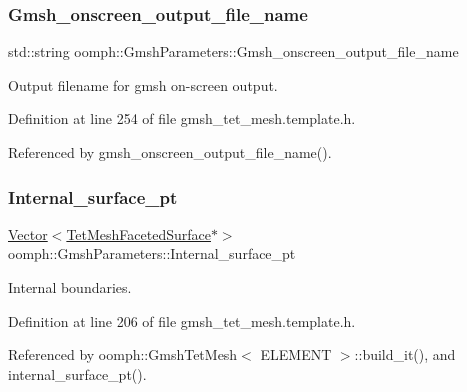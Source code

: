 \subsubsection{\texorpdfstring{Gmsh\+\_\+onscreen\+\_\+output\+\_\+file\+\_\+name}{Gmsh\_onscreen\_output\_file\_name}}
{\footnotesize\ttfamily std\+::string oomph\+::\+Gmsh\+Parameters\+::\+Gmsh\+\_\+onscreen\+\_\+output\+\_\+file\+\_\+name\hspace{0.3cm}{\ttfamily [private]}}



Output filename for gmsh on-\/screen output. 



Definition at line 254 of file gmsh\+\_\+tet\+\_\+mesh.\+template.\+h.



Referenced by gmsh\+\_\+onscreen\+\_\+output\+\_\+file\+\_\+name().

\mbox{\label{classoomph_1_1GmshParameters_aaa4afdde73a7fc67d5c2ba2976235381}} 
\subsubsection{\texorpdfstring{Internal\+\_\+surface\+\_\+pt}{Internal\_surface\_pt}}
{\footnotesize\ttfamily \hyperlink{classoomph_1_1Vector}{Vector}$<$\hyperlink{classoomph_1_1TetMeshFacetedSurface}{Tet\+Mesh\+Faceted\+Surface}$\ast$$>$ oomph\+::\+Gmsh\+Parameters\+::\+Internal\+\_\+surface\+\_\+pt\hspace{0.3cm}{\ttfamily [private]}}



Internal boundaries. 



Definition at line 206 of file gmsh\+\_\+tet\+\_\+mesh.\+template.\+h.



Referenced by oomph\+::\+Gmsh\+Tet\+Mesh$<$ E\+L\+E\+M\+E\+N\+T $>$\+::build\+\_\+it(), and internal\+\_\+surface\+\_\+pt().

\mbox{\label{classoomph_1_1GmshParameters_a65bd88591891ff4284fb4e03d6f49c14}} 
